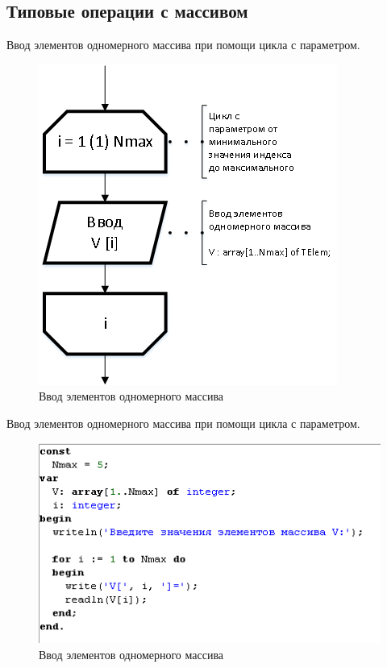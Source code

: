 \documentclass{beamer}
\begin{document}
\subsection{Типовые операции с массивом}
\begin{frame}
Ввод элементов одномерного массива при помощи цикла с параметром.
\begin{figure}[h]
\centering
\includegraphics[scale=0.5]{images/array_input.png}
\caption{Ввод элементов одномерного массива}
\label{pic-input-one-index}
\end{figure}
\end{frame}

\begin{frame}
Ввод элементов одномерного массива при помощи цикла с параметром.
\begin{figure}[h]
\centering
\includegraphics[scale=1.0]{images/array_input_code_one.png}
\caption{Ввод элементов одномерного массива}
\label{pic-input-one-index-code}
\end{figure}
\end{frame}
\end{document}
